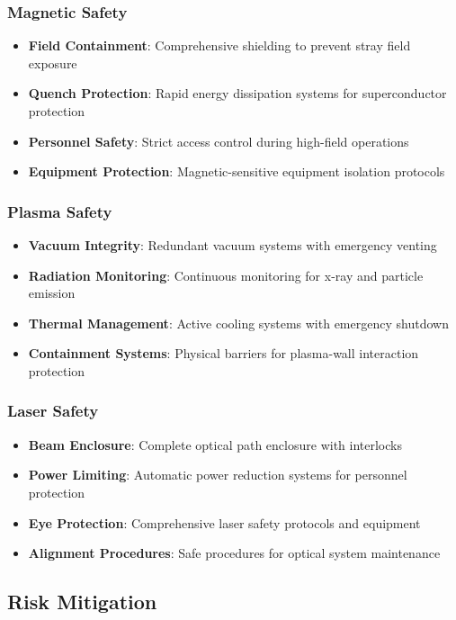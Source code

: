 \documentclass[12pt,a4paper]{article}
\begin{document}
\subsubsection{Magnetic Safety}
\begin{itemize}
\item \textbf{Field Containment}: Comprehensive shielding to prevent stray field exposure
\item \textbf{Quench Protection}: Rapid energy dissipation systems for superconductor protection
\item \textbf{Personnel Safety}: Strict access control during high-field operations
\item \textbf{Equipment Protection}: Magnetic-sensitive equipment isolation protocols
\end{itemize}

\subsubsection{Plasma Safety}
\begin{itemize}
\item \textbf{Vacuum Integrity}: Redundant vacuum systems with emergency venting
\item \textbf{Radiation Monitoring}: Continuous monitoring for x-ray and particle emission
\item \textbf{Thermal Management}: Active cooling systems with emergency shutdown
\item \textbf{Containment Systems}: Physical barriers for plasma-wall interaction protection
\end{itemize}

\subsubsection{Laser Safety}
\begin{itemize}
\item \textbf{Beam Enclosure}: Complete optical path enclosure with interlocks
\item \textbf{Power Limiting}: Automatic power reduction systems for personnel protection
\item \textbf{Eye Protection}: Comprehensive laser safety protocols and equipment
\item \textbf{Alignment Procedures}: Safe procedures for optical system maintenance
\end{itemize}

\subsection{Risk Mitigation}
\end{document}
